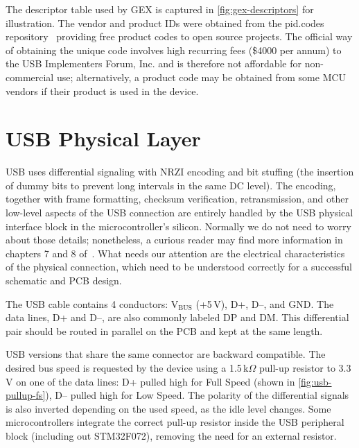 The descriptor table used by GEX is captured in \cref{fig:gex-descriptors} for illustration. The vendor and product IDs were obtained from the pid.codes repository~\cite{pidcodes} providing free product codes to open source projects. The official way of obtaining the unique code involves high recurring fees (\$4000 per annum) to the USB Implementers Forum, Inc. and is therefore not affordable for non-commercial use; alternatively, a product code may be obtained from some \gls{MCU} vendors if their product is used in the device.
\newpage



\section{USB Physical Layer}

\gls{USB} uses differential signaling with \gls{NRZI} encoding and bit stuffing (the insertion of dummy bits to prevent long intervals in the same \gls{DC} level). The encoding, together with frame formatting, checksum verification, retransmission, and other low-level aspects of the \gls{USB} connection are entirely handled by the \gls{USB} physical interface block in the microcontroller's silicon. Normally we do not need to worry about those details; nonetheless, a curious reader may find more information in chapters 7 and 8 of~\cite{usbif-spec}. What needs our attention are the electrical characteristics of the physical connection, which need to be understood correctly for a successful schematic and \gls{PCB} design.

The \gls{USB} cable contains 4 conductors: V$_\mathrm{BUS}$ (+5\,V), D+, D--, and \gls{GND}. The data lines, D+ and D--, are also commonly labeled DP and DM. This differential pair should be routed in parallel on the \gls{PCB} and kept at the same length.

\gls{USB} versions that share the same connector are backward compatible. The desired bus speed is requested by the device using a 1.5\,k$\Omega$ pull-up resistor to 3.3\,V on one of the data lines: D+ pulled high for Full Speed (shown in \cref{fig:usb-pullup-fs}), D-- pulled high for Low Speed. The polarity of the differential signals is also inverted depending on the used speed, as the idle level changes. Some microcontrollers integrate the correct pull-up resistor inside the \gls{USB} peripheral block (including out STM32F072), removing the need for an external resistor.

